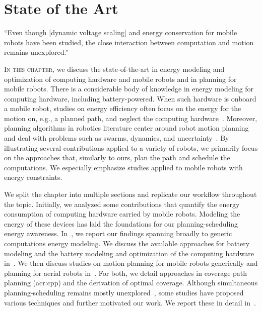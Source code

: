 %
%
%
%
\chapter{State of the Art}
\label{cp:soa}

\begin{chapquote}{\cite{brateman2006energy}}
  ``Even though [dynamic voltage scaling] and energy conservation for mobile robots have been studied, the close interaction between computation and motion remains unexplored.''
\end{chapquote}

\vspace*{1em}

\lettrine{I}{n this chapter}, we discuss the state-of-the-art in energy modeling and optimization of computing hardware and mobile robots and in planning for mobile robots. There is a considerable body of knowledge in energy modeling for computing hardware, including battery-powered. When such hardware is onboard a mobile robot, studies on energy efficiency often focus on the energy for the motion on, e.g., a planned path, and neglect the computing hardware~\citep{ondruska2015scheduled}. Moreover, planning algorithms in robotics literature center around robot motion planning and deal with problems such as swarms, dynamics, and uncertainty~\citep{lavalle2006planning}. By illustrating several contributions applied to a variety of robots, we primarily focus on the approaches that, similarly to ours, plan the path and schedule the computations. We especially emphasize studies applied to mobile robots with energy constraints.

We split the chapter into multiple sections and replicate our workflow throughout the topic. Initially, we analyzed some contributions that quantify the energy consumption of computing hardware carried by mobile robots. Modeling the energy of these devices has laid the foundations for our planning-scheduling energy awareness. In~, we report our findings spanning broadly to generic computations energy modeling. We discuss the available approaches for battery modeling and the battery modeling and optimization of the computing hardware in~. We then discuss studies on motion planning for mobile robots generically and planning for aerial robots in~. For both, we detail approaches in coverage path planning (\Gls{acr:cpp}) and the derivation of optimal coverage. Although simultaneous planning-scheduling remains mostly unexplored~\citep{brateman2006energy,ondruska2015scheduled,sudhakar2020balancing}, some studies have proposed various techniques and further motivated our work. We report these in detail in~.

